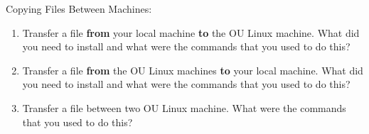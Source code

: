 \item[\textbf{Problem 3}]
Copying Files Between Machines:
\begin{enumerate}[label=(\arabic*)]
    \item Transfer a file \textbf{from} your local machine \textbf{to} the OU
          Linux machine. What did you need to install and what were the commands
          that you used to do this?
    \item Transfer a file \textbf{from} the OU Linux machines \textbf{to} your
          local machine. What did you need to install and what were the commands
          that you used to do this?
    \item Transfer a file between two OU Linux machine. What were the commands
          that you used to do this?
\end{enumerate}

\Solution

